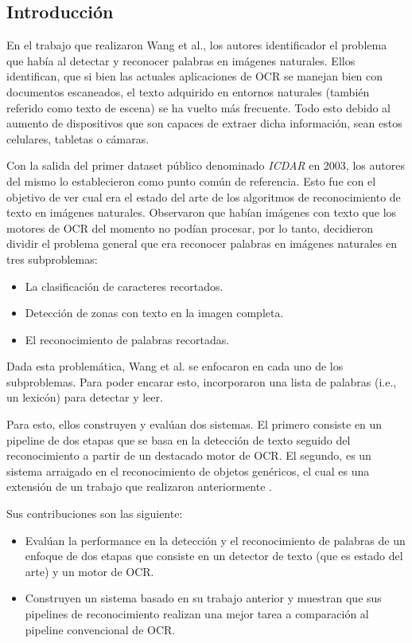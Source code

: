 \subsection{Introducción}

	En el trabajo que realizaron Wang et al., los autores identificador el problema que había al detectar y reconocer palabras en imágenes naturales. Ellos identifican, que si bien las actuales aplicaciones de OCR se manejan bien con documentos escaneados, el texto adquirido en entornos naturales (también referido como texto de escena) se ha vuelto más frecuente. Todo esto debido al aumento de dispositivos que son capaces de extraer dicha información, sean estos celulares, tabletas o cámaras.
	
	Con la salida del primer dataset público denominado \textit{ICDAR} en 2003, los autores del mismo lo establecieron como punto común de referencia. Esto fue con el objetivo de ver cual era el estado del arte de los algoritmos de reconocimiento de texto en imágenes naturales. Observaron que habían imágenes con texto que los motores de OCR del momento no podían procesar, por lo tanto, decidieron dividir el problema general que era reconocer palabras en imágenes naturales en tres subproblemas:
	\begin{itemize}
		\item La clasificación de caracteres recortados.
		\item Detección de zonas con texto en la imagen completa.
		\item El reconocimiento de palabras recortadas.
	\end{itemize}
	
	Dada esta problemática, Wang et al. se enfocaron en cada uno de los subproblemas. Para poder encarar esto, incorporaron una lista de palabras (i.e., un lexicón) para detectar y leer.
		
	Para esto, ellos construyen y evalúan dos sistemas. El primero consiste en un pipeline de dos etapas que se basa en la detección de texto seguido del reconocimiento a partir de un destacado motor de OCR. El segundo, es un sistema arraigado en el reconocimiento de objetos genéricos, el cual es una extensión de un trabajo que realizaron anteriormente \cite{WB10}.
	
	Sus contribuciones son las siguiente:
		\begin{itemize}
			\item Evalúan la performance en la detección y el reconocimiento de palabras de un enfoque de dos etapas que consiste en un detector de texto (que es estado del arte) y un motor de OCR.
			\item Construyen un sistema basado en su trabajo anterior \cite{WB10} y muestran que sus pipelines de reconocimiento realizan una mejor tarea a comparación al pipeline convencional de OCR.
		\end{itemize}